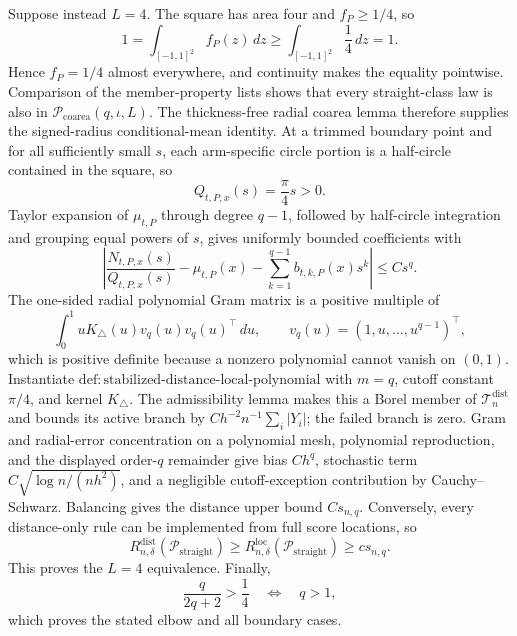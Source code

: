 Suppose instead \(L=4\).  The square has area four and \(f_P\geq1/4\), so
\[
1=\int_{[-1,1]^2}f_P(z)\,dz\geq\int_{[-1,1]^2}\frac14\,dz=1.
\]
Hence \(f_P=1/4\) almost everywhere, and continuity makes the equality pointwise.  Comparison of the member-property lists shows that every straight-class law is also in \(\mathcal P_{\mathrm{coarea}}(q,\iota,L)\).  The thickness-free radial coarea lemma therefore supplies the signed-radius conditional-mean identity.  At a trimmed boundary point and for all sufficiently small \(s\), each arm-specific circle portion is a half-circle contained in the square, so
\[
Q_{t,P,x}(s)=\frac\pi4s>0.
\]
Taylor expansion of \(\mu_{t,P}\) through degree \(q-1\), followed by half-circle integration and grouping equal powers of \(s\), gives uniformly bounded coefficients with
\[
\left|\frac{N_{t,P,x}(s)}{Q_{t,P,x}(s)}-\mu_{t,P}(x)
-\sum_{k=1}^{q-1}b_{t,k,P}(x)s^k\right|\leq Cs^q.
\]
The one-sided radial polynomial Gram matrix is a positive multiple of
\[
\int_0^1uK_\triangle(u)v_q(u)v_q(u)^\top\,du,
\qquad v_q(u)=(1,u,\ldots,u^{q-1})^\top,
\]
which is positive definite because a nonzero polynomial cannot vanish on \((0,1)\).  Instantiate \(\mathrm{def:stabilized\text{-}distance\text{-}local\text{-}polynomial}\) with \(m=q\), cutoff constant \(\pi/4\), and kernel \(K_\triangle\).  The admissibility lemma makes this a Borel member of \(\mathcal T_n^{\mathrm{dist}}\) and bounds its active branch by \(Ch^{-2}n^{-1}\sum_i|Y_i|\); the failed branch is zero.  Gram and radial-error concentration on a polynomial mesh, polynomial reproduction, and the displayed order-\(q\) remainder give bias \(Ch^q\), stochastic term \(C\sqrt{\log n/(nh^2)}\), and a negligible cutoff-exception contribution by Cauchy--Schwarz.  Balancing gives the distance upper bound \(Cs_{n,q}\).  Conversely, every distance-only rule can be implemented from full score locations, so
\[
R_{n,\delta}^{\mathrm{dist}}(\mathcal P_{\mathrm{straight}})
\geq R_{n,\delta}^{\mathrm{loc}}(\mathcal P_{\mathrm{straight}})
\geq cs_{n,q}.
\]
This proves the \(L=4\) equivalence.  Finally,
\[
\frac{q}{2q+2}>\frac14\quad\Longleftrightarrow\quad q>1,
\]
which proves the stated elbow and all boundary cases.